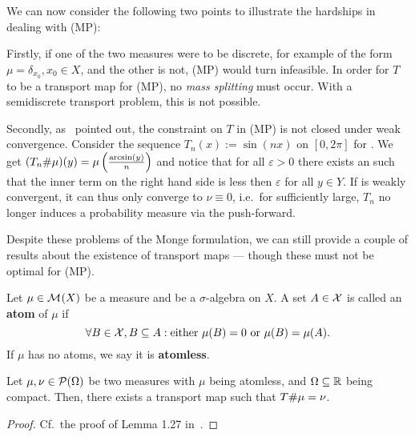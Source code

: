 We can now consider the following two points to illustrate the hardships in dealing with (MP):

Firstly, if one of the two measures were to be discrete, for example of the form $\mu = \delta_{x_0}, x_0 \in X$, and the other is not, (MP) would turn infeasible. In order for $T$ to be a transport map for (MP), no \textit{mass splitting} must occur. With a semidiscrete transport problem, this is not possible.

Secondly, as~\cite{San2015} pointed out, the constraint on $T$ in (MP) is not closed under weak convergence. Consider the sequence $T_n(x) := \sin(nx)$ on $[0, 2 \pi]$ for \NinN. We get $(\push[T_n]{\mu})(y) = \mu\left( \frac{\arcsin(y)}{n} \right)$ and notice that for all $\varepsilon > 0$ there exists an \NinN{} such that the inner term on the right hand side is less then $\varepsilon$ for all $y \in Y$. If \push[T_n]{\mu} is weakly convergent, it can thus only converge to $\nu \equiv 0$, i.e.\ for \NinN{} sufficiently large, $T_n$ no longer induces a probability measure via the push-forward.

Despite these problems of the Monge formulation, we can still provide a couple of results about the existence of transport maps --- though these must not be optimal for (MP).

\begin{definition}\label{Atoms}
	Let $\mu \in \M{X}$ be a measure and \X{} be a $\sigma$-algebra on $X$. A set $A \in \X$ is called an \textbf{atom} of $\mu$ if
	\[ \forall B \in \X, B \subseteq A : \text{either } \mu(B) = 0 \text{ or } \mu(B) = \mu(A). \]
	If $\mu$ has no atoms, we say it is \textbf{atomless}.
\end{definition}

\begin{lemma}\label{1DTransMapExist}
	Let $\mu, \nu \in \PM{\Omega}$ be two measures with $\mu$ being atomless, and $\Omega \subseteq \R$ being compact. Then, there exists a transport map \map[T]{\Omega}{\Omega} such that $\push{\mu} = \nu$.
\end{lemma}

\begin{proof}
	Cf.~the proof of Lemma 1.27 in~\cite{San2015}.
\end{proof}


